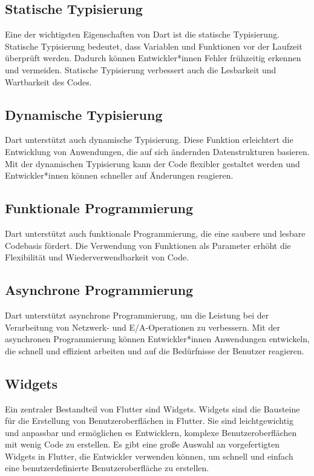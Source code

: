 \subsection{Statische Typisierung}
Eine der wichtigsten Eigenschaften von Dart ist die statische Typisierung. Statische Typisierung bedeutet, dass Variablen und Funktionen vor der Laufzeit überprüft werden. Dadurch können Entwickler*innen Fehler frühzeitig erkennen und vermeiden. Statische Typisierung verbessert auch die Lesbarkeit und Wartbarkeit des Codes.

\subsection{Dynamische Typisierung}
Dart unterstützt auch dynamische Typisierung. Diese Funktion erleichtert die Entwicklung von Anwendungen, die auf sich ändernden Datenstrukturen basieren. Mit der dynamischen Typisierung kann der Code flexibler gestaltet werden und Entwickler*innen können schneller auf Änderungen reagieren.

\subsection{Funktionale Programmierung}
Dart unterstützt auch funktionale Programmierung, die eine saubere und lesbare Codebasis fördert. Die Verwendung von Funktionen als Parameter erhöht die Flexibilität und Wiederverwendbarkeit von Code.

\subsection{Asynchrone Programmierung}
Dart unterstützt asynchrone Programmierung, um die Leistung bei der Verarbeitung von Netzwerk- und E/A-Operationen zu verbessern. Mit der asynchronen Programmierung können Entwickler*innen Anwendungen entwickeln, die schnell und effizient arbeiten und auf die Bedürfnisse der Benutzer reagieren.

\subsection{Widgets}

Ein zentraler Bestandteil von Flutter sind Widgets. Widgets sind die Bausteine für die Erstellung von Benutzeroberflächen in Flutter. Sie sind leichtgewichtig und anpassbar und ermöglichen es Entwicklern, komplexe Benutzeroberflächen mit wenig Code zu erstellen. Es gibt eine große Auswahl an vorgefertigten Widgets in Flutter, die Entwickler verwenden können, um schnell und einfach eine benutzerdefinierte Benutzeroberfläche zu erstellen.

